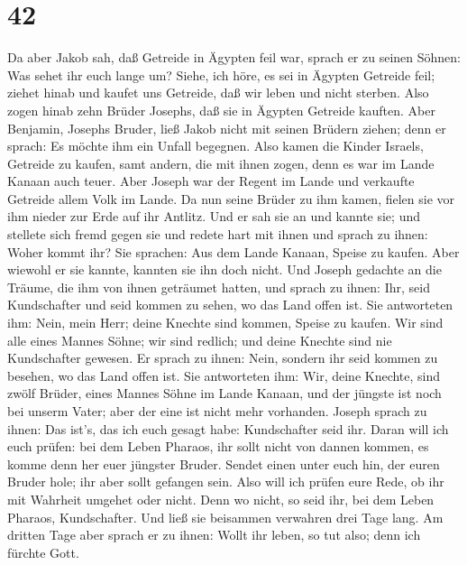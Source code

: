 \hypertarget{section-41}{%
\section{42}\label{section-41}}

 Da aber Jakob sah, daß Getreide in Ägypten feil war, sprach
er zu seinen Söhnen: Was sehet ihr euch lange um?  Siehe,
ich höre, es sei in Ägypten Getreide feil; ziehet hinab und kaufet uns
Getreide, daß wir leben und nicht sterben.  Also zogen hinab
zehn Brüder Josephs, daß sie in Ägypten Getreide kauften. 
Aber Benjamin, Josephs Bruder, ließ Jakob nicht mit seinen Brüdern
ziehen; denn er sprach: Es möchte ihm ein Unfall begegnen. 
Also kamen die Kinder Israels, Getreide zu kaufen, samt andern, die mit
ihnen zogen, denn es war im Lande Kanaan auch teuer.  Aber
Joseph war der Regent im Lande und verkaufte Getreide allem Volk im
Lande. Da nun seine Brüder zu ihm kamen, fielen sie vor ihm nieder zur
Erde auf ihr Antlitz.  Und er sah sie an und kannte sie; und
stellete sich fremd gegen sie und redete hart mit ihnen und sprach zu
ihnen: Woher kommt ihr? Sie sprachen: Aus dem Lande Kanaan, Speise zu
kaufen.  Aber wiewohl er sie kannte, kannten sie ihn doch
nicht.  Und Joseph gedachte an die Träume, die ihm von ihnen
geträumet hatten, und sprach zu ihnen: Ihr, seid Kundschafter und seid
kommen zu sehen, wo das Land offen ist.  Sie antworteten
ihm: Nein, mein Herr; deine Knechte sind kommen, Speise zu kaufen.
 Wir sind alle eines Mannes Söhne; wir sind redlich; und
deine Knechte sind nie Kundschafter gewesen.  Er sprach zu
ihnen: Nein, sondern ihr seid kommen zu besehen, wo das Land offen ist.
 Sie antworteten ihm: Wir, deine Knechte, sind zwölf
Brüder, eines Mannes Söhne im Lande Kanaan, und der jüngste ist noch bei
unserm Vater; aber der eine ist nicht mehr vorhanden. 
Joseph sprach zu ihnen: Das ist's, das ich euch gesagt habe:
Kundschafter seid ihr.  Daran will ich euch prüfen: bei dem
Leben Pharaos, ihr sollt nicht von dannen kommen, es komme denn her euer
jüngster Bruder.  Sendet einen unter euch hin, der euren
Bruder hole; ihr aber sollt gefangen sein. Also will ich prüfen eure
Rede, ob ihr mit Wahrheit umgehet oder nicht. Denn wo nicht, so seid
ihr, bei dem Leben Pharaos, Kundschafter.  Und ließ sie
beisammen verwahren drei Tage lang.  Am dritten Tage aber
sprach er zu ihnen: Wollt ihr leben, so tut also; denn ich fürchte Gott.
